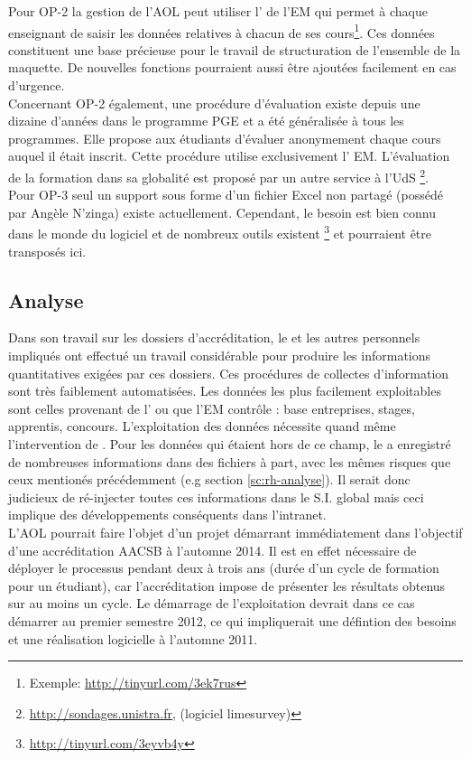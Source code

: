 \documentclass{book}
\begin{document}
Pour OP-2 la gestion de l'AOL peut utiliser l' de l'EM qui
permet à chaque enseignant de saisir les données relatives à chacun de ses 
cours\footnote{Exemple: \url{http://tinyurl.com/3ek7rus}}. Ces données 
constituent une base précieuse pour le travail de structuration de l'ensemble
de la maquette. De nouvelles fonctions pourraient aussi être ajoutées facilement
en cas d'urgence.\\

Concernant OP-2 également, une procédure d'évaluation existe depuis une dizaine 
d'années dans le programme PGE et a été généralisée à tous les programmes. Elle 
propose aux étudiants d'évaluer anonymement chaque cours auquel il était inscrit. 
Cette procédure utilise exclusivement l' EM.
L'évaluation de la formation dans sa globalité est proposé par un autre service à l'UdS%
\footnote{\url{http://sondages.unistra.fr}, (logiciel limesurvey)}.\\

Pour OP-3 seul un support sous forme d'un fichier Excel non partagé (possédé par Angèle 
N'zinga) existe actuellement. Cependant, le besoin est
bien connu dans le monde du logiciel et de nombreux outils existent%
\footnote{\url{http://tinyurl.com/3eyvb4y}}
et pourraient être transposés ici.


\subsection{Analyse}
\label{sc:sop-analyse}

Dans son travail sur les dossiers d'accréditation, le \sop et les autres
personnels impliqués ont effectué un travail considérable pour produire
les informations quantitatives exigées par ces dossiers. Ces procédures
de collectes d'information sont très faiblement automatisées. Les données
les plus facilement exploitables sont celles provenant de l'
ou que l'EM contrôle : base entreprises, stages, apprentis, concours. 
L'exploitation des données nécessite quand même l'intervention de \CK. 
Pour les données qui étaient hors de ce champ, le \sop a enregistré de
nombreuses informations dans des fichiers à part, avec les mêmes risques
que ceux mentionés précédemment (e.g section \ref{sc:rh-analyse}). 
Il serait donc judicieux de ré-injecter toutes ces informations dans le S.I.
global mais ceci implique des développements conséquents dans l'intranet.\\


L'AOL pourrait faire l'objet d'un projet démarrant immédiatement dans
l'objectif d'une accréditation AACSB à l'automne 2014. Il est en effet 
nécessaire de déployer le processus pendant deux à trois ans (durée
d'un cycle de formation pour un étudiant), car l'accréditation impose de
présenter les résultats obtenus sur au moins un cycle. Le démarrage de
l'exploitation devrait dans ce cas démarrer au premier semestre 2012,
ce qui impliquerait une défintion des besoins et une réalisation logicielle
à l'automne 2011.
\end{document}
